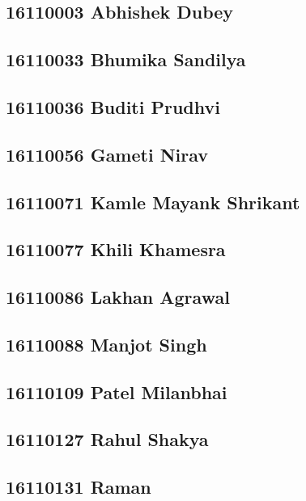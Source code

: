 \documentclass[journal=jpcbfk,manuscript=article]{achemso}
\begin{document}
\subsection {16110003	Abhishek Dubey}

\subsection {16110033	Bhumika Sandilya}

\subsection {16110036	Buditi Prudhvi}

\subsection {16110056	Gameti Nirav}

\subsection {16110071	Kamle Mayank Shrikant}

\subsection {16110077	Khili Khamesra}

\subsection {16110086	Lakhan Agrawal}

\subsection {16110088	Manjot Singh}

\subsection {16110109	Patel Milanbhai}

\subsection {16110127	Rahul Shakya}

\subsection {16110131	Raman}
\end{document}

